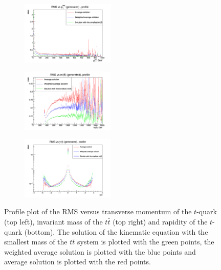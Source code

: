 \begin{figure}[h]
\centering
\begin{subfigure}
  \centering
  \includegraphics[width=0.49\textwidth]{10_appendices/min_Mtt/plots/Abs-pt.png}
\end{subfigure}
\begin{subfigure}
  \centering
  \includegraphics[width=0.49\textwidth]{10_appendices/min_Mtt/plots/Abs-mtt.png}
\end{subfigure}
\begin{subfigure}
  \centering
  \includegraphics[width=0.49\textwidth]{10_appendices/min_Mtt/plots/Abs-y.png}
\end{subfigure}
\caption{Profile plot of the RMS versus transverse momentum of the $t$-quark (top left), invariant mass of the $t\bar{t}$ (top right) and rapidity of the
$t$-quark (bottom). The solution of the kinematic equation with the smallest mass of the $t\bar{t}$ system is plotted with the green points, the weighted average solution is plotted
with the blue points and average solution is plotted with the red points.}
\label{fig:Absvs}
\end{figure}